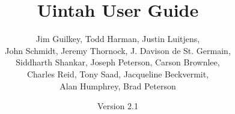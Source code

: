 \documentclass[12pt]{report}
\begin{document}
\title{Uintah User Guide}


\author{ Jim Guilkey, Todd Harman, Justin Luitjens, \\ John Schmidt, Jeremy Thornock, J. Davison de St. Germain, \\ Siddharth Shankar, Joseph Peterson, Carson Brownlee,\\ Charles Reid, Tony Saad, Jacqueline Beckvermit,\\Alan Humphrey, Brad Peterson }

\date{Version 2.1}

\maketitle

\tableofcontents

%

\newpage











\end{document}
